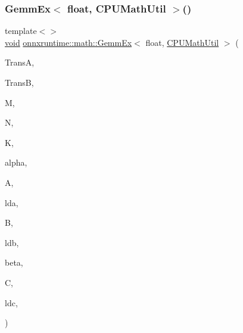\subsubsection{\texorpdfstring{Gemm\+Ex$<$ float, C\+P\+U\+Math\+Util $>$()}{GemmEx< float, CPUMathUtil >()}}
{\footnotesize\ttfamily template$<$$>$ \\
\mbox{\hyperlink{mlasi_8h_a88f941d423cb2a819b70a1358982b1a6}{void}} \mbox{\hyperlink{namespaceonnxruntime_1_1math_a9c33fbd7bdc74a3620921afbc8135451}{onnxruntime\+::math\+::\+Gemm\+Ex}}$<$ float, \mbox{\hyperlink{classonnxruntime_1_1CPUMathUtil}{C\+P\+U\+Math\+Util}} $>$ (\begin{DoxyParamCaption}\item[{const \mbox{\hyperlink{cblas_8h_a44dfaddb823648755b110dbad849c5a9}{C\+B\+L\+A\+S\+\_\+\+T\+R\+A\+N\+S\+P\+O\+SE}}}]{TransA,  }\item[{const \mbox{\hyperlink{cblas_8h_a44dfaddb823648755b110dbad849c5a9}{C\+B\+L\+A\+S\+\_\+\+T\+R\+A\+N\+S\+P\+O\+SE}}}]{TransB,  }\item[{const int}]{M,  }\item[{const int}]{N,  }\item[{const int}]{K,  }\item[{const float}]{alpha,  }\item[{const float $\ast$}]{A,  }\item[{const int}]{lda,  }\item[{const float $\ast$}]{B,  }\item[{const int}]{ldb,  }\item[{const float}]{beta,  }\item[{float $\ast$}]{C,  }\item[{const int}]{ldc,  }\item[{\mbox{\hyperlink{classonnxruntime_1_1CPUMathUtil}{C\+P\+U\+Math\+Util}} $\ast$}]{ }\end{DoxyParamCaption})}

\mbox{\label{namespaceonnxruntime_1_1math_af2b62cb055259e26d89f0ff4056b8e84}} 
